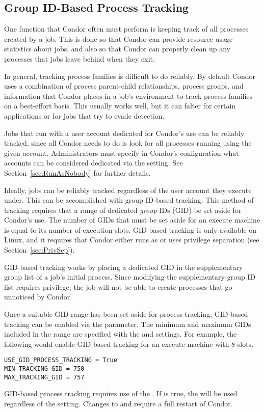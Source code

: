 \subsection{\label{sec:GroupTracking}Group ID-Based Process Tracking} 

One function that Condor often must perform is keeping track of all
processes created by a job. This is done so that Condor can provide
resource usage statistics about jobs, and also so that Condor can properly
clean up any processes that jobs leave behind when they exit.

In general, tracking process families is difficult to do reliably.
By default Condor uses a combination of process parent-child
relationships, process groups, and information that Condor places in a
job's environment to track process families on a best-effort
basis. This usually works well, but it can falter for certain
applications or for jobs that try to evade detection.

Jobs that run with a user account dedicated for Condor's use
can be reliably tracked, since all Condor needs to do is look for all
processes running using the given account. Administrators must specify
in Condor's configuration what accounts can be considered dedicated
via the  setting. See
Section~\ref{sec:RunAsNobody} for further details.

Ideally, jobs can be reliably tracked regardless of the user account
they execute under. This can be accomplished with group ID-based
tracking. This method of tracking requires that a range of dedicated
\emph{group} IDs (GID) be set aside for Condor's use. The number of GIDs
that must be set aside for an execute machine is equal to its number
of execution slots. GID-based tracking is only available on Linux, and
it requires that Condor either runs as  or uses privilege
separation (see Section~\ref{sec:PrivSep}).

GID-based tracking works by placing a dedicated GID in the
supplementary group list of a job's initial process. Since modifying
the supplementary group ID list requires
 privilege, the job will not be able to create processes
that go unnoticed by Condor.

Once a suitable GID range has been set aside for process tracking,
GID-based tracking can be enabled via the
 parameter. The minimum and maximum
GIDs included in the range are specified with the
 and 
settings. For example, the following would enable GID-based tracking
for an execute machine with 8 slots.
\begin{verbatim}
USE_GID_PROCESS_TRACKING = True
MIN_TRACKING_GID = 750
MAX_TRACKING_GID = 757
\end{verbatim}

GID-based process tracking requires use of the . If
 is true, the  will
be used regardless of the  setting.  Changes to
 and  require
a full restart of Condor.
